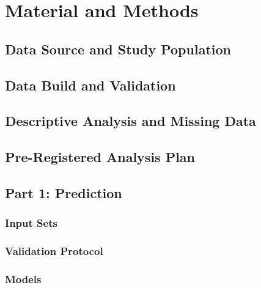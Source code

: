\chapter{Material and Methods}
\label{ch:methods}

\section{Data Source and Study Population}

\section{Data Build and Validation}

\section{Descriptive Analysis and Missing Data}

\section{Pre-Registered Analysis Plan}

\section{Part 1: Prediction}
\subsection{Input Sets}
\subsection{Validation Protocol}
\subsection{Models}

